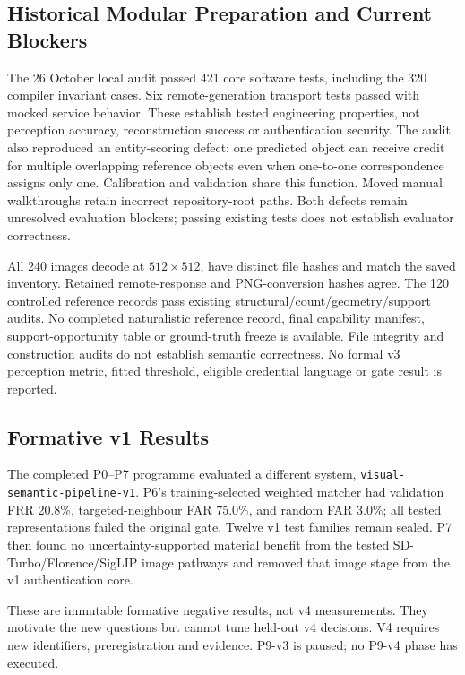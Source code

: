 \documentclass[compsoc,conference,a4paper,10pt,times]{IEEEtran}
\begin{document}
\subsection{Historical Modular Preparation and Current Blockers}
The 26 October local audit passed 421 core software tests, including the 320 compiler invariant cases. Six remote-generation transport tests passed with mocked service behavior. These establish tested engineering properties, not perception accuracy, reconstruction success or authentication security. The audit also reproduced an entity-scoring defect: one predicted object can receive credit for multiple overlapping reference objects even when one-to-one correspondence assigns only one. Calibration and validation share this function. Moved manual walkthroughs retain incorrect repository-root paths. Both defects remain unresolved evaluation blockers; passing existing tests does not establish evaluator correctness.

All 240 images decode at $512\times512$, have distinct file hashes and match the saved inventory. Retained remote-response and PNG-conversion hashes agree. The 120 controlled reference records pass existing structural/count/geometry/support audits. No completed naturalistic reference record, final capability manifest, support-opportunity table or ground-truth freeze is available. File integrity and construction audits do not establish semantic correctness. No formal v3 perception metric, fitted threshold, eligible credential language or gate result is reported.

\subsection{Formative v1 Results}
The completed P0--P7 programme evaluated a different system, \texttt{visual-semantic-pipeline-v1}. P6's training-selected weighted matcher had validation FRR 20.8\%, targeted-neighbour FAR 75.0\%, and random FAR 3.0\%; all tested representations failed the original gate. Twelve v1 test families remain sealed. P7 then found no uncertainty-supported material benefit from the tested SD-Turbo/Florence/SigLIP image pathways and removed that image stage from the v1 authentication core.

These are immutable formative negative results, not v4 measurements. They motivate the new questions but cannot tune held-out v4 decisions. V4 requires new identifiers, preregistration and evidence. P9-v3 is paused; no P9-v4 phase has executed.
\end{document}
